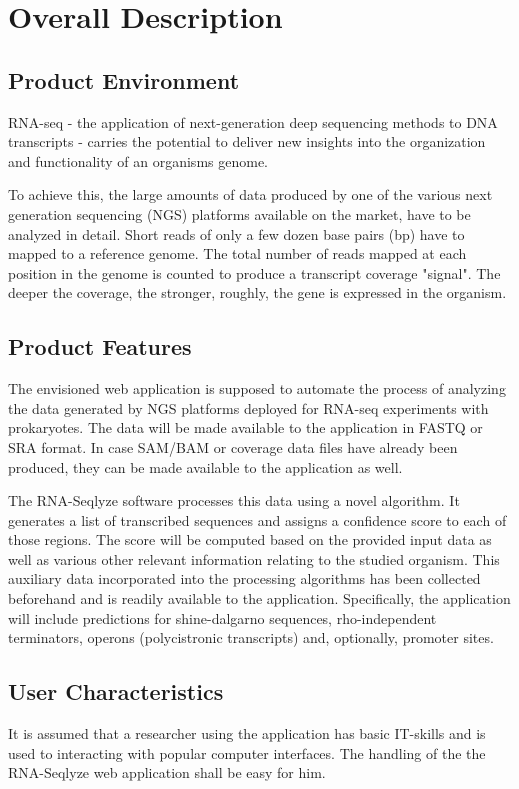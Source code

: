 \documentclass[a4paper]{srs}
\begin{document}
	\section{Overall Description}

\subsection{Product Environment}

RNA-seq - the application of next-generation deep sequencing methods to DNA
transcripts - carries the potential to deliver new insights into the
organization and functionality of an organisms genome.

To achieve this, the large amounts of data produced by one of the various next
generation sequencing (NGS) platforms available on the market, have to be
analyzed in detail. Short reads of only a few dozen base pairs (bp) have to
mapped to a reference genome. The total number of reads mapped at each position
in the genome is counted to produce a transcript coverage "signal". The deeper
the coverage, the stronger, roughly, the gene is expressed in the organism.

\subsection{Product Features}

The envisioned web application is supposed to automate the process of analyzing
the data generated by NGS platforms deployed for RNA-seq experiments with
prokaryotes. The data will be made available to the application in FASTQ
or SRA format. In case SAM/BAM or coverage data files have already been
produced, they can be made available to the application as well.

The RNA-Seqlyze software processes this data using a novel algorithm.
It generates a list of transcribed sequences and assigns a confidence score to
each of those regions. The score will be computed based on the provided input
data as well as various other relevant information relating to the studied
organism. This auxiliary data incorporated into the processing algorithms has
been collected beforehand and is readily available to the application.
Specifically, the application will include predictions for shine-dalgarno
sequences, rho-independent terminators, operons (polycistronic transcripts) and,
optionally, promoter sites.

\subsection{User Characteristics}
It is assumed that a researcher using the application has basic
IT-skills and is used to interacting with popular computer interfaces.
The handling of the the RNA-Seqlyze web application shall be easy for him.
\end{document}
